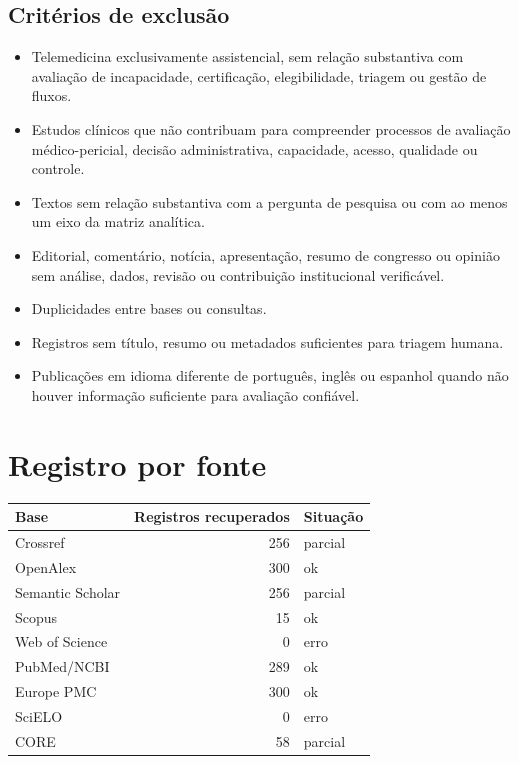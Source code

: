 \documentclass[12pt,a4paper]{article}
\begin{document}
\subsection{Critérios de exclusão}
\label{sec:org2841155}
\begin{itemize}
\item Telemedicina exclusivamente assistencial, sem relação substantiva com avaliação de incapacidade, certificação, elegibilidade, triagem ou gestão de fluxos.
\item Estudos clínicos que não contribuam para compreender processos de avaliação médico-pericial, decisão administrativa, capacidade, acesso, qualidade ou controle.
\item Textos sem relação substantiva com a pergunta de pesquisa ou com ao menos um eixo da matriz analítica.
\item Editorial, comentário, notícia, apresentação, resumo de congresso ou opinião sem análise, dados, revisão ou contribuição institucional verificável.
\item Duplicidades entre bases ou consultas.
\item Registros sem título, resumo ou metadados suficientes para triagem humana.
\item Publicações em idioma diferente de português, inglês ou espanhol quando não houver informação suficiente para avaliação confiável.
\end{itemize}

\section{Registro por fonte}
\label{sec:orgc6f30fb}
\begin{center}
\begin{tabular}{lrl}
Base & Registros recuperados & Situação\\
\hline
Crossref & 256 & parcial\\
OpenAlex & 300 & ok\\
Semantic Scholar & 256 & parcial\\
Scopus & 15 & ok\\
Web of Science & 0 & erro\\
PubMed/NCBI & 289 & ok\\
Europe PMC & 300 & ok\\
SciELO & 0 & erro\\
CORE & 58 & parcial\\
\end{tabular}
\end{center}
\end{document}
